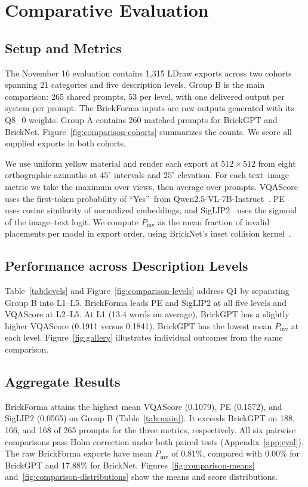 \section{Comparative Evaluation}
\label{sec:eval}
\subsection{Setup and Metrics}
\label{sec:setup}
The November 16 evaluation contains 1,315 LDraw exports across two cohorts spanning 21 categories and five description levels. Group B is the main comparison: 265 shared prompts, 53 per level, with one delivered output per system per prompt. The BrickForma inputs are raw outputs generated with its Q8\_0 weights. Group A contains 260 matched prompts for BrickGPT and BrickNet. Figure~\ref{fig:comparison-cohorts} summarizes the counts. We score all supplied exports in both cohorts.

We use uniform yellow material and render each export at $512{\times}512$ from eight orthographic azimuths at $45^\circ$ intervals and $25^\circ$ elevation. For each text--image metric we take the maximum over views, then average over prompts. VQAScore~\cite{vqascore} uses the first-token probability of \textquotedblleft Yes\textquotedblright\ from Qwen2.5-VL-7B-Instruct~\cite{qwen25vl}. PE~\cite{pe} uses cosine similarity of normalized embeddings, and SigLIP2~\cite{siglip2} uses the sigmoid of the image--text logit. We compute $P_{\mathrm{inv}}$ as the mean fraction of invalid placements per model in export order, using BrickNet's inset collision kernel~\cite{bricknet}.

\subsection{Performance across Description Levels}
Table~\ref{tab:levels} and Figure~\ref{fig:comparison-levels} address Q1 by separating Group B into L1--L5. BrickForma leads PE and SigLIP2 at all five levels and VQAScore at L2--L5. At L1 (13.4 words on average), BrickGPT has a slightly higher VQAScore (0.1911 versus 0.1841). BrickGPT has the lowest mean $P_{\mathrm{inv}}$ at each level. Figure~\ref{fig:gallery} illustrates individual outcomes from the same comparison.


\subsection{Aggregate Results}

BrickForma attains the highest mean VQAScore (0.1079), PE (0.1572), and SigLIP2 (0.0565) on Group B (Table~\ref{tab:main}). It exceeds BrickGPT on 188, 166, and 168 of 265 prompts for the three metrics, respectively. All six pairwise comparisons pass Holm correction under both paired tests (Appendix~\ref{app:eval}). The raw BrickForma exports have mean $P_{\mathrm{inv}}$ of 0.81\%, compared with 0.00\% for BrickGPT and 17.88\% for BrickNet. Figures~\ref{fig:comparison-means} and~\ref{fig:comparison-distributions} show the means and score distributions.

